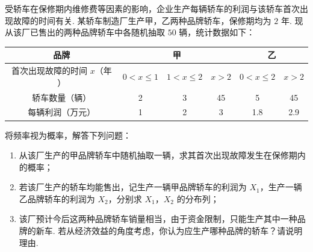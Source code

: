 \begin{problem}
受轿车在保修期内维修费等因素的影响，企业生产每辆轿车的利润与该轿车首次出现故障的时间有关. 某轿车制造厂生产甲，乙两种品牌轿车，保修期均为 \(2\) 年. 现从该厂已售出的两种品牌轿车中各随机抽取 \(50\) 辆，统计数据如下：

\begin{center}
\renewcommand{\arraystretch}{1.2}
\begin{tabular}{|c|c|c|c|c|c|}
\hline
品牌 & \multicolumn{3}{c|}{甲} & \multicolumn{2}{c|}{乙} \\
\hline
首次出现故障的时间 \(x\)（\(\text{年}\)） & \(0 < x \leqslant 1\) & \(1 < x \leqslant 2\) & \(x > 2\) & \(0 < x \leqslant 2\) & \(x > 2\) \\
\hline
轿车数量（\(\text{辆}\)） & 2 & 3 & 45 & 5 & 45 \\
\hline
每辆利润（\(\text{万元}\)） & 1 & 2 & 3 & 1.8 & 2.9 \\
\hline
\end{tabular}
\end{center}

将频率视为概率，解答下列问题：

\begin{enumerate}
\item 从该厂生产的甲品牌轿车中随机抽取一辆，求其首次出现故障发生在保修期内的概率；
\item 若该厂生产的轿车均能售出，记生产一辆甲品牌轿车的利润为 \(X_{1}\)，生产一辆乙品牌轿车的利润为 \(X_{2}\)，分别求 \(X_{1}\)，\(X_{2}\) 的分布列；
\item 该厂预计今后这两种品牌轿车销量相当，由于资金限制，只能生产其中一种品牌的新车. 若从经济效益的角度考虑，你认为应生产哪种品牌的轿车？请说明理由.
\end{enumerate}
\end{problem}

